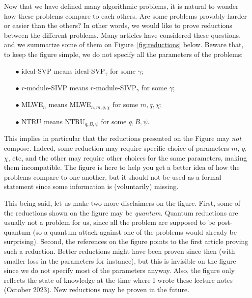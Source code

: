Now that we have defined many algorithmic problems, it is natural to wonder how these problems compare to each others. Are some problems provably harder or easier than the others? In other words, we would like to prove reductions between the different problems. Many articles have considered these questions, and we summarize some of them on Figure~\ref{fig:reductions} below. Beware that, to keep the figure simple, we do not specify all the parameters of the problems:
\begin{itemize}
\item[$\bullet$] ideal-SVP means ideal-SVP$_\gamma$ for some $\gamma$;
\item[$\bullet$] $r$-module-SIVP means $r$-module-SIVP$_\gamma$ for some $\gamma$;
\item[$\bullet$] MLWE$_{n}$ means MLWE$_{n,m,q,\chi}$ for some $m,q,\chi$;
\item[$\bullet$] NTRU means NTRU$_{q,B,\psi}$ for some $q, B, \psi$.
\end{itemize}
This implies in particular that the reductions presented on the Figure may \emph{not} compose. Indeed, some reduction may require specific choice of parameters $m$, $q$, $\chi$, etc, and the other may require other choices for the same parameters, making them incompatible. The figure is here to help you get a better idea of how the problems compare to one another, but it should not be used as a formal statement since some information is (voluntarily) missing.

This being said, let us make two more disclaimers on the figure. First, some of the reductions shown on the figure may be \emph{quantum}. Quantum reductions are usually not a problem for us, since all the problem are supposed to be post-quantum (so a quantum attack against one of the problems would already be surprising).
Second, the references on the figure points to the first article proving such a reduction. Better reductions might have been proven since then (with smaller loss in the parameters for instance), but this is invisible on the figure since we do not specify most of the parameters anyway. Also, the figure only reflects the state of knowledge at the time where I wrote these lecture notes (October 2023). New reductions may be proven in the future.


